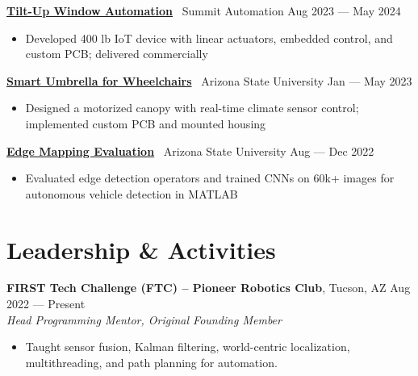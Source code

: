 \documentclass[10pt]{article}
\begin{document}
\textbf{\href{https://www.youtube.com/watch?v=i5I38tLkD6o}{Tilt-Up Window Automation}} \textbar\ Summit Automation \hfill Aug 2023 --- May 2024
\begin{itemize}
  \item Developed 400 lb IoT device with linear actuators, embedded control, and custom PCB; delivered commercially
\end{itemize}
\textbf{\href{https://EGR314-Team205.github.io}{Smart Umbrella for Wheelchairs}} \textbar\ Arizona State University \hfill Jan --- May 2023
\begin{itemize}
  \item Designed a motorized canopy with real-time climate sensor control; implemented custom PCB and mounted housing
\end{itemize}
\textbf{\href{https://github.com/MGross21/EdgeMappingResearchProject}{Edge Mapping Evaluation}} \textbar\ Arizona State University \hfill Aug --- Dec 2022
\begin{itemize}
  \item Evaluated edge detection operators and trained CNNs on 60k+ images for autonomous vehicle detection in MATLAB
\end{itemize}
\section*{Leadership \& Activities}
\textbf{FIRST Tech Challenge (FTC) -- Pioneer Robotics Club}, Tucson, AZ \hfill Aug 2022 --- Present \\
\textit{Head Programming Mentor, Original Founding Member}
\begin{itemize}
  \item Taught sensor fusion, Kalman filtering, world-centric localization, multithreading, and path planning for automation.
\end{itemize}

\end{document}
